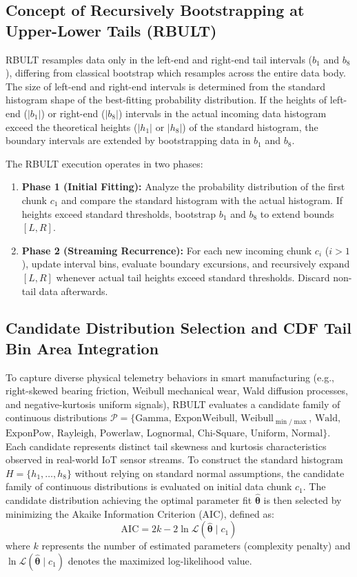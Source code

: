 \documentclass[a4paper,fleqn]{cas-sc}
\begin{document}
\subsection{Concept of Recursively Bootstrapping at Upper-Lower Tails (RBULT)}
\label{concept}
RBULT resamples data only in the left-end and right-end tail intervals ($b_1$ and $b_8$), differing from classical bootstrap which resamples across the entire data body. The size of left-end and right-end intervals is determined from the standard histogram shape of the best-fitting probability distribution. If the heights of left-end ($|b_1|$) or right-end ($|b_8|$) intervals in the actual incoming data histogram exceed the theoretical heights ($|h_1|$ or $|h_8|$) of the standard histogram, the boundary intervals are extended by bootstrapping data in $b_1$ and $b_8$.

The RBULT execution operates in two phases:
\begin{enumerate}
    \item \textbf{Phase 1 (Initial Fitting):} Analyze the probability distribution of the first chunk $c_1$ and compare the standard histogram with the actual histogram. If heights exceed standard thresholds, bootstrap $b_1$ and $b_8$ to extend bounds $[L, R]$.
    \item \textbf{Phase 2 (Streaming Recurrence):} For each new incoming chunk $c_i$ ($i > 1$), update interval bins, evaluate boundary excursions, and recursively expand $[L, R]$ whenever actual tail heights exceed standard thresholds. Discard non-tail data afterwards.
\end{enumerate}

\subsection{Candidate Distribution Selection and CDF Tail Bin Area Integration}
To capture diverse physical telemetry behaviors in smart manufacturing (e.g., right-skewed bearing friction, Weibull mechanical wear, Wald diffusion processes, and negative-kurtosis uniform signals), RBULT evaluates a candidate family of continuous distributions $\mathcal{P} = \{\text{Gamma}$, $\text{ExponWeibull}$, $\text{Weibull}_{\min/\max}$, $\text{Wald}$, $\text{ExponPow}$, $\text{Rayleigh}$, $\text{Powerlaw}$, $\text{Lognormal}$, $\text{Chi-Square}$, $\text{Uniform}$, $\text{Normal}\}$. Each candidate represents distinct tail skewness and kurtosis characteristics observed in real-world IoT sensor streams.
To construct the standard histogram $H = \{h_1, \dots, h_8\}$ without relying on standard normal assumptions, the candidate family of continuous distributions is evaluated on initial data chunk $c_1$. The candidate distribution achieving the optimal parameter fit $\hat{\boldsymbol{\theta}}$ is then selected by minimizing the Akaike Information Criterion (AIC), defined as:
\begin{equation}
\text{AIC} = 2k - 2\ln \mathcal{L}(\hat{\boldsymbol{\theta}} \mid c_1)
\end{equation}
where $k$ represents the number of estimated parameters (complexity penalty) and $\ln \mathcal{L}(\hat{\boldsymbol{\theta}} \mid c_1)$ denotes the maximized log-likelihood value.
\end{document}
